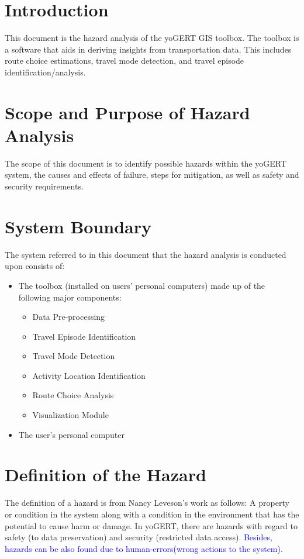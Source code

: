 \documentclass{article}
\begin{document}
\section{Introduction}
This document is the hazard analysis of the yoGERT GIS toolbox. The toolbox is a software that aids in deriving insights from transportation data. This includes route choice estimations, travel mode detection, and travel episode identification/analysis.
\section{Scope and Purpose of Hazard Analysis}
The scope of this document is to identify possible hazards within the yoGERT system, the causes and effects of failure, steps for mitigation, as well as safety and security requirements.
\section{System Boundary}
The system referred to in this document that the hazard analysis is conducted upon consists of:
\begin{itemize}
    \item The toolbox (installed on users' personal computers) made up of the following major components:
    \begin{itemize}
        \item Data Pre-processing
        \item Travel Episode Identification
        \item Travel Mode Detection
        \item Activity Location Identification
        \item Route Choice Analysis
        \item Visualization Module
    \end{itemize}
    \item The user's personal computer
    
\end{itemize}
\section{Definition of the Hazard}
The definition of a hazard is from Nancy Leveson's work as follows: A property or condition in the system along with a condition in the environment that has the potential to cause harm or damage. In yoGERT, there are hazards with regard to safety (to data preservation) and security (restricted data access). \textcolor{blue}{Besides, hazards can be also found due to human-errors(wrong actions to the system).}
\end{document}

